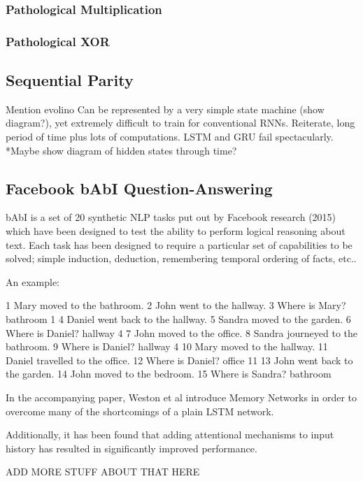 \documentclass{article}
\begin{document}
\subsubsection{Pathological Multiplication}

\subsubsection{Pathological XOR}

\subsection{Sequential Parity}

Mention evolino
Can be represented by a very simple state machine (show diagram?), yet extremely difficult to train for conventional RNNs.
Reiterate, long period of time plus lots of computations. LSTM and GRU fail spectacularly.
*Maybe show diagram of hidden states through time?

\subsection{Facebook bAbI Question-Answering}

bAbI is a set of 20 synthetic NLP tasks put out by Facebook research (2015) which have been designed to test the ability to perform logical reasoning about text. Each task has been designed to require a particular set of capabilities to be solved; simple induction, deduction, remembering temporal ordering of facts, etc..

An example:

1 Mary moved to the bathroom.
2 John went to the hallway.
3 Where is Mary?        bathroom        1
4 Daniel went back to the hallway.
5 Sandra moved to the garden.
6 Where is Daniel?      hallway 4
7 John moved to the office.
8 Sandra journeyed to the bathroom.
9 Where is Daniel?      hallway 4
10 Mary moved to the hallway.
11 Daniel travelled to the office.
12 Where is Daniel?     office  11
13 John went back to the garden.
14 John moved to the bedroom.
15 Where is Sandra?     bathroom


In the accompanying paper, Weston et al introduce Memory Networks in order to overcome many of the shortcomings of a plain LSTM network. 

Additionally, it has been found that adding attentional mechanisms to input history has resulted in significantly improved performance.

ADD MORE STUFF ABOUT THAT HERE
\end{document}
